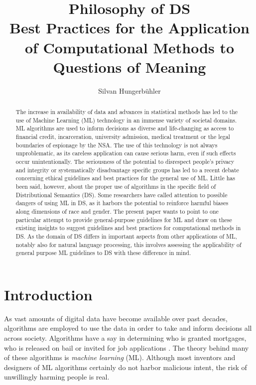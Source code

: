 \documentclass{article}
\title{Philosophy of DS\\
\large Best Practices for the Application of Computational Methods to Questions of Meaning}
\date{}
\author{Silvan Hungerb{\"u}hler}
\begin{document}
\maketitle
\begin{abstract}
The increase in availability of data and advances in statistical methods has led to the use of Machine Learning (ML) technology in an immense variety of societal domains. ML algorithms are used to inform decisions as diverse and life-changing as access to financial credit, incarceration, university admission, medical treatment or the legal boundaries of espionage by the NSA.
The use of this technology is not always unproblematic, as its careless application can cause serious harm, even if such effects occur unintentionally.
The seriousness of the potential to disrespect people's privacy and integrity or systematically disadvantage specific groups has led to a recent debate concerning ethical guidelines and best practices for the general use of ML.
Little has been said, however, about the proper use of algorithms in the specific field of Distributional Semantics (DS). Some researchers have called attention to possible dangers of using ML in DS, as it harbors the potential to reinforce harmful biases along dimensions of race and gender.
The present paper wants to point to one particular attempt to provide general-purpose guidelines for ML and draw on these existing insights to suggest guidelines and best practices for computational methods in DS.
As the domain of DS differs in important aspects from other applications of ML, notably also for natural language processing,
this involves assessing  the applicability of general purpose ML guidelines to DS with these difference in mind.
\end{abstract}
\section{Introduction}
As vast amounts of digital data have become available over past decades, algorithms are employed to use the data in order to take and inform decisions all across society. 
Algorithms have a say in determining who is granted mortgages, who is released on bail or invited for job applications \cite{algorithms2016}.
The theory behind many of these algorithms is \emph{machine learning} (ML).
Although most inventors and designers of ML algorithms certainly do not harbor malicious intent, the risk of unwillingly harming people is real.
\end{document}
